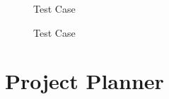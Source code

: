 \documentclass[oneside,a4paper,12pt]{report}
\begin{document}
{\begin{appendices}
\begin{center}
	\begin{figure}[H]
		\centering
	  \caption{Test Case}
	  \label{fig:state-dig}
	\end{figure}
\end{center}

\begin{center}
	\begin{figure}[H]
		\centering
	  \caption{Test Case}
	  \label{fig:state-dig}
	\end{figure}
\end{center}


\chapter{Project Planner}
\label{app:plan}


\end{appendices}}
\end{document}
